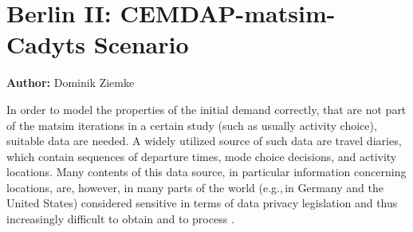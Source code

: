 \section{Berlin II: CEMDAP-\protect\gls{matsim}-Cadyts Scenario}
\label{sec:berlinII}
\hfill \textbf{Author:} Dominik Ziemke

%
In order to model the properties of the initial demand correctly, that are not part of the \gls{matsim} iterations in a certain study (such as usually activity choice), suitable data are needed. A widely utilized source of such data are travel diaries, which contain sequences of departure times, mode choice decisions, and activity locations.
%
Many contents of this data source, in particular information concerning locations, are, however, in many parts of the world (e.g.,\,in Germany and the United States) considered sensitive in terms of data privacy legislation and thus increasingly difficult to obtain and to process \citep{ZiemkeNagelBhat2015IntegratingCemdapMatsimTransferabilityTRB}.

